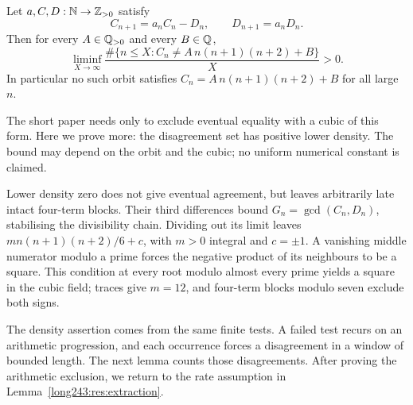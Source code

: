 \documentclass[11pt]{article}
\begin{document}
\begin{theorem}\label{long243:res:cubicexclusion}
Let $a,C,D:\mathbb{N}\to\mathbb{Z}_{>0}$ satisfy
\begin{equation}\label{long243:eq:cubicorbit}
 C_{n+1}=a_nC_n-D_n,\qquad D_{n+1}=a_nD_n .
\end{equation}
Then for every $A\in\mathbb{Q}_{>0}$ and every $B\in\mathbb{Q}$,
\[
 \liminf_{X\to\infty}
 \frac{\#\{n\le X:C_n\ne A\,n(n+1)(n+2)+B\}}{X}>0 .
\]
In particular no such orbit satisfies $C_n=A\,n(n+1)(n+2)+B$ for all
large $n$.
\end{theorem}

The short paper needs only to exclude eventual equality with a cubic
of this form. Here we prove more: the disagreement set has positive
lower density. The bound may depend on the orbit and the cubic; no
uniform numerical constant is claimed.

Lower density zero does not give eventual agreement, but leaves
arbitrarily late intact four-term blocks. Their third differences
bound $G_n=\gcd(C_n,D_n)$, stabilising the divisibility chain. Dividing
out its limit leaves $m n(n+1)(n+2)/6+c$, with $m>0$ integral and
$c=\pm1$. A vanishing middle numerator modulo a prime forces the
negative product of its neighbours to be a square. This condition at
every root modulo almost every prime yields a square in the cubic
field; traces give
$m=12$, and four-term blocks modulo seven exclude both signs.

The density assertion comes from the same finite tests. A failed test
recurs on an arithmetic progression, and each occurrence forces a
disagreement in a window of bounded length. The next lemma counts
those disagreements. After proving the arithmetic exclusion, we return
to the rate assumption in Lemma~\ref{long243:res:extraction}.
\end{document}
